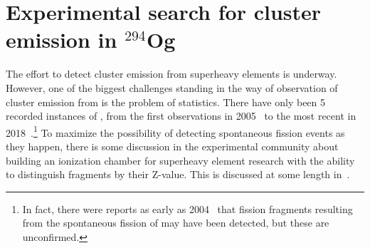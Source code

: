 \section{Experimental search for cluster emission in $^{294}$Og}

The effort to detect cluster emission from superheavy elements is underway. However, one of the biggest challenges standing in the way of observation of cluster emission from {\Og} is the problem of statistics. There have only been 5 recorded instances of {\Og}, from the first observations in 2005~\cite{Oganessian2006} to the most recent in 2018~\cite{Brewer2018}.\footnote{In fact, there were reports as early as 2004~\cite{Oganessian2004} that fission fragments resulting from the spontaneous fission of {\Og} may have been detected, but these are unconfirmed.} To maximize the possibility of detecting spontaneous fission events as they happen, there is some discussion in the experimental community about building an ionization chamber for superheavy element research with the ability to distinguish fragments by their Z-value. This is discussed at some length in~\cite{Brewer2018}.

%
